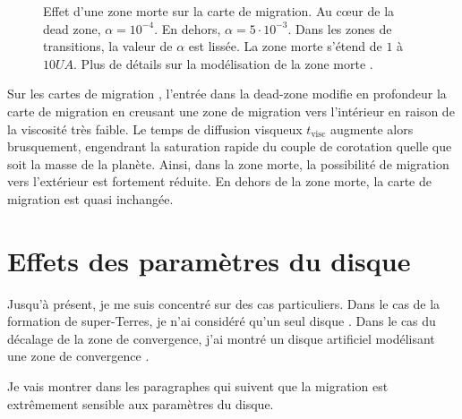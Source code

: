 \begin{figure}[htb]
\centering
{}\hfill
{}

\caption{Effet d'une zone morte sur la carte de migration. Au cœur de la dead zone, $\alpha=10^{-4}$. En dehors, $\alpha=5\cdot 10^{-3}$. Dans les zones de transitions, la valeur de $\alpha$ est lissée. La zone morte s'étend de $1$ à $10\unit{UA}$. Plus de détails sur la modélisation de la zone morte \protect{}. }\label{fig:viscosity_DZ}
\end{figure}

Sur les cartes de migration , l'entrée dans la dead-zone modifie en profondeur la carte de migration en creusant une zone de migration vers l'intérieur en raison de la viscosité très faible. Le temps de diffusion visqueux $t_\text{visc}$ augmente alors brusquement, engendrant la saturation rapide du couple de corotation quelle que soit la masse de la planète. Ainsi, dans la zone morte, la possibilité de migration vers l'extérieur est fortement réduite. En dehors de la zone morte, la carte de migration est quasi inchangée. 

\section{Effets des paramètres du disque}

Jusqu'à présent, je me suis concentré sur des cas particuliers. Dans le cas de la formation de super-Terres, je n'ai considéré
qu'un seul disque . Dans le cas du décalage de la zone de convergence, j'ai montré un disque artificiel
modélisant une zone de convergence . 

Je vais montrer dans les paragraphes qui suivent que la migration est extrêmement sensible aux paramètres du disque.

